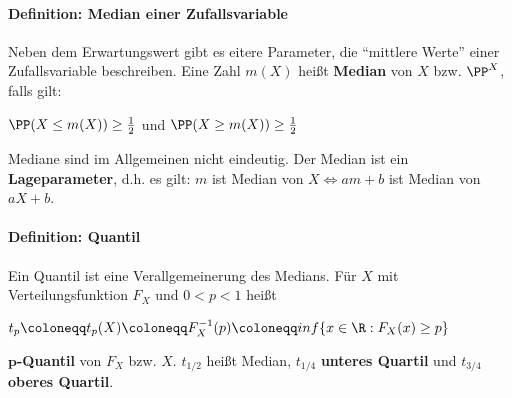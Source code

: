 \paragraph{Definition: Median einer Zufallsvariable}
Neben dem Erwartungswert gibt es eitere Parameter, die \enquote{mittlere Werte} einer Zufallsvariable beschreiben.
Eine Zahl $m(X)$ heißt \textbf{Median} von $X$ bzw. $\PP^X$, falls gilt:
\begin{tightcenter}
	$\PP(X\leq m(X))\geq\frac{1}{2}$ und $\PP(X\geq m(X))\geq\frac{1}{2}$
\end{tightcenter}
Mediane sind im Allgemeinen nicht eindeutig. 
Der Median ist ein \textbf{Lageparameter}, d.h. es gilt: $m$ ist Median von $X\iff am+b$ ist Median von $aX+b$.

\paragraph{Definition: Quantil}
Ein Quantil ist eine Verallgemeinerung des Medians.
Für $X$ mit Verteilungsfunktion $F_X$ und $0<p<1$ heißt
\begin{tightcenter}
	$t_p\coloneqq t_p(X)\coloneqq F_{X}^{-1}(p)\coloneqq inf\{x\in\R:F_X(x)\geq p\}$
\end{tightcenter}
$\boldsymbol{p}$\textbf{-Quantil} von $F_X$ bzw. $X$. 
$t_{1/2}$ heißt Median, $t_{1/4}$ \textbf{unteres Quartil} und $t_{3/4}$ \textbf{oberes Quartil}.